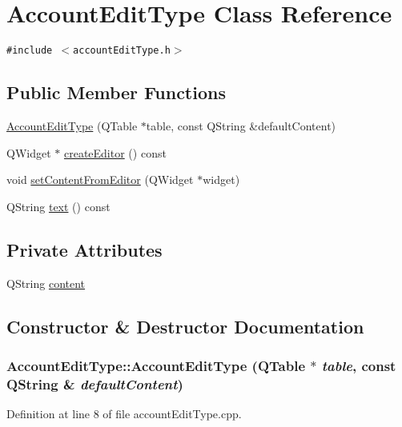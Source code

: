 \hypertarget{classAccountEditType}{
\section{Account\-Edit\-Type Class Reference}
\label{classAccountEditType}
}
{\tt \#include $<$account\-Edit\-Type.h$>$}

\subsection*{Public Member Functions}
\begin{CompactItemize}
\item 
\hyperlink{classAccountEditType_a0}{Account\-Edit\-Type} (QTable $\ast$table, const QString \&default\-Content)
\item 
QWidget $\ast$ \hyperlink{classAccountEditType_a1}{create\-Editor} () const
\item 
void \hyperlink{classAccountEditType_a2}{set\-Content\-From\-Editor} (QWidget $\ast$widget)
\item 
QString \hyperlink{classAccountEditType_a3}{text} () const
\end{CompactItemize}
\subsection*{Private Attributes}
\begin{CompactItemize}
\item 
QString \hyperlink{classAccountEditType_r0}{content}
\end{CompactItemize}


\subsection{Constructor \& Destructor Documentation}
\hypertarget{classAccountEditType_a0}{
\subsubsection[AccountEditType]{\setlength{\rightskip}{0pt plus 5cm}Account\-Edit\-Type::Account\-Edit\-Type (QTable $\ast$ {\em table}, const QString \& {\em default\-Content})}}
\label{classAccountEditType_a0}


Definition at line 8 of file account\-Edit\-Type.cpp.

